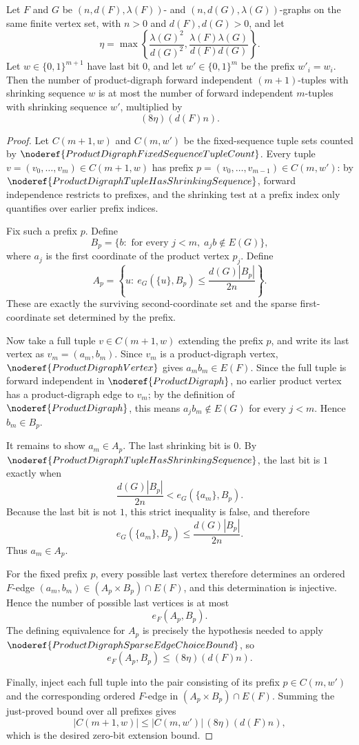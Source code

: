 \begin{helper}
Let \(F\) and \(G\) be \((n,d(F),\lambda(F))\)- and \((n,d(G),\lambda(G))\)-graphs on the same finite vertex set, with \(n>0\) and \(d(F),d(G)>0\), and let
\[
  \eta=\max\left\{\frac{\lambda(G)^2}{d(G)^2},
  \frac{\lambda(F)\lambda(G)}{d(F)d(G)}\right\}.
\]
Let \(w\in\{0,1\}^{m+1}\) have last bit \(0\), and let \(w'\in\{0,1\}^m\) be the prefix \(w'_i=w_i\). Then the number of product-digraph forward independent \((m+1)\)-tuples with shrinking sequence \(w\) is at most the number of forward independent \(m\)-tuples with shrinking sequence \(w'\), multiplied by
\[
  (8\eta)(d(F)n).
\]
\end{helper}
\begin{proof}
Let \(C(m+1,w)\) and \(C(m,w')\) be the fixed-sequence tuple sets counted by \(\noderef{ProductDigraphFixedSequenceTupleCount}\). Every tuple \(v=(v_0,\ldots,v_m)\in C(m+1,w)\) has prefix \(p=(v_0,\ldots,v_{m-1})\in C(m,w')\): by \(\noderef{ProductDigraphTupleHasShrinkingSequence}\), forward independence restricts to prefixes, and the shrinking test at a prefix index only quantifies over earlier prefix indices.

Fix such a prefix \(p\). Define
\[
  B_p=\{b:\text{ for every }j<m,\; a_jb\notin E(G)\},
\]
where \(a_j\) is the first coordinate of the product vertex \(p_j\). Define
\[
  A_p=\left\{u:\ e_G(\{u\},B_p)\le \frac{d(G)|B_p|}{2n}\right\}.
\]
These are exactly the surviving second-coordinate set and the sparse first-coordinate set determined by the prefix.

Now take a full tuple \(v\in C(m+1,w)\) extending the prefix \(p\), and write its last vertex as \(v_m=(a_m,b_m)\). Since \(v_m\) is a product-digraph vertex, \(\noderef{ProductDigraphVertex}\) gives \(a_mb_m\in E(F)\). Since the full tuple is forward independent in \(\noderef{ProductDigraph}\), no earlier product vertex has a product-digraph edge to \(v_m\); by the definition of \(\noderef{ProductDigraph}\), this means \(a_jb_m\notin E(G)\) for every \(j<m\). Hence \(b_m\in B_p\).

It remains to show \(a_m\in A_p\). The last shrinking bit is \(0\). By \(\noderef{ProductDigraphTupleHasShrinkingSequence}\), the last bit is \(1\) exactly when
\[
  \frac{d(G)|B_p|}{2n}<e_G(\{a_m\},B_p).
\]
Because the last bit is not \(1\), this strict inequality is false, and therefore
\[
  e_G(\{a_m\},B_p)\le \frac{d(G)|B_p|}{2n}.
\]
Thus \(a_m\in A_p\).

For the fixed prefix \(p\), every possible last vertex therefore determines an ordered \(F\)-edge \((a_m,b_m)\in (A_p\times B_p)\cap E(F)\), and this determination is injective. Hence the number of possible last vertices is at most
\[
  e_F(A_p,B_p).
\]
The defining equivalence for \(A_p\) is precisely the hypothesis needed to apply \(\noderef{ProductDigraphSparseEdgeChoiceBound}\), so
\[
  e_F(A_p,B_p)\le (8\eta)(d(F)n).
\]

Finally, inject each full tuple into the pair consisting of its prefix \(p\in C(m,w')\) and the corresponding ordered \(F\)-edge in \((A_p\times B_p)\cap E(F)\). Summing the just-proved bound over all prefixes gives
\[
  |C(m+1,w)|\le |C(m,w')|\,(8\eta)(d(F)n),
\]
which is the desired zero-bit extension bound.
\end{proof}
